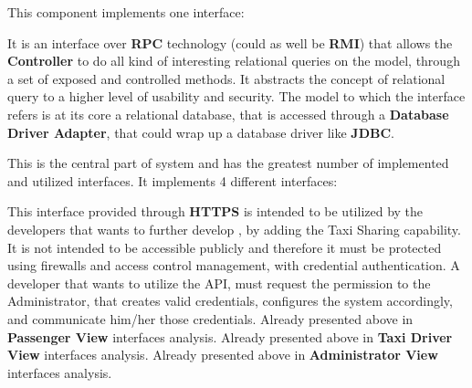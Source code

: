 \begin{itemize}
\begin{itemize}
	\end{itemize}
	This component implements one interface:
	\begin{itemize}
		 It is an interface over \textbf{RPC} technology (could as well be \textbf{RMI}) that allows the \textbf{Controller} to do all kind of interesting relational queries on the \myTaxiService{} model, through a set of exposed and controlled methods.
		It abstracts the concept of relational query to a higher level of usability and security.
		The model to which the interface refers is at its core a relational database, that is accessed through a \textbf{Database Driver Adapter}, that could wrap up a database driver like \textbf{JDBC}.
	\end{itemize}
	\itemBold{Controller}
	This is the central part of \myTaxiService{} system and has the greatest number of implemented and utilized interfaces.
	It implements 4 different interfaces:
	\begin{itemize}
		 This interface provided through \textbf{HTTPS} is intended to be utilized by the developers that wants to further develop \myTaxiService{}, by adding the Taxi Sharing capability.
		It is not intended to be accessible publicly and therefore it must be protected using firewalls and access control management, with credential authentication.
		A developer that wants to utilize the API, must request the permission to the Administrator, that creates valid credentials, configures the system accordingly, and communicate him/her those credentials.
		 Already presented above in \textbf{Passenger View} interfaces analysis.
		 Already presented above in \textbf{Taxi Driver View} interfaces analysis.
		 Already presented above in \textbf{Administrator View} interfaces analysis.
	\end{itemize}
\end{itemize}

